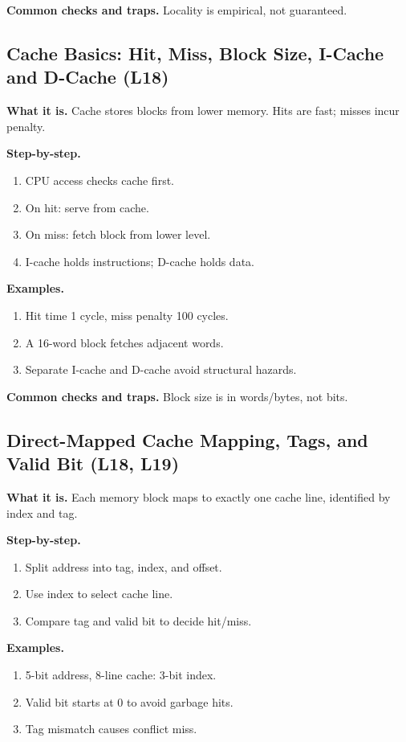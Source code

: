 \documentclass[11pt]{article}
\begin{document}
\textbf{Common checks and traps.} Locality is empirical, not guaranteed.

\subsection{Cache Basics: Hit, Miss, Block Size, I-Cache and D-Cache (L18)}
\textbf{What it is.} Cache stores blocks from lower memory. Hits are fast; misses incur penalty.

\textbf{Step-by-step.}
\begin{enumerate}[leftmargin=*]
  \item CPU access checks cache first.
  \item On hit: serve from cache.
  \item On miss: fetch block from lower level.
  \item I-cache holds instructions; D-cache holds data.
\end{enumerate}

\textbf{Examples.}
\begin{enumerate}[leftmargin=*]
  \item Hit time 1 cycle, miss penalty 100 cycles.
  \item A 16-word block fetches adjacent words.
  \item Separate I-cache and D-cache avoid structural hazards.
\end{enumerate}

\textbf{Common checks and traps.} Block size is in words/bytes, not bits.

\subsection{Direct-Mapped Cache Mapping, Tags, and Valid Bit (L18, L19)}
\textbf{What it is.} Each memory block maps to exactly one cache line, identified by index and tag.

\textbf{Step-by-step.}
\begin{enumerate}[leftmargin=*]
  \item Split address into tag, index, and offset.
  \item Use index to select cache line.
  \item Compare tag and valid bit to decide hit/miss.
\end{enumerate}

\textbf{Examples.}
\begin{enumerate}[leftmargin=*]
  \item 5-bit address, 8-line cache: 3-bit index.
  \item Valid bit starts at 0 to avoid garbage hits.
  \item Tag mismatch causes conflict miss.
\end{enumerate}
\end{document}
